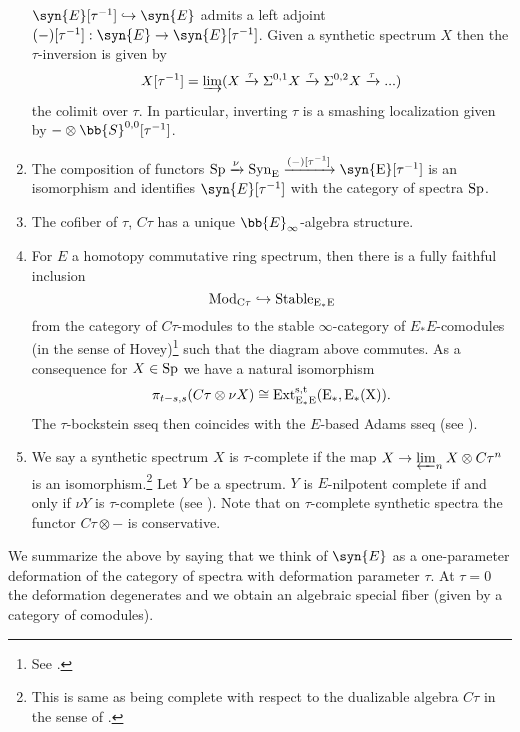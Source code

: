 \begin{rec}
\begin{enumerate}
        $\syn{E}[\tau^{-1}] \hookrightarrow \syn{E}$
        admits a left adjoint 
        $(-)[\tau^{-1}]: \syn{E} \rightarrow \syn{E}[\tau^{-1}]$. 
        Given a synthetic spectrum $X$ then the $\tau$-inversion is given by
        $$X[\tau^{-1}] = \varinjlim ( X \xrightarrow{\tau} \Sigma^{0,1} X \xrightarrow{\tau} \Sigma^{0,2}X \xrightarrow{\tau}...)$$
        the colimit over $\tau$. 
        In particular, inverting $\tau$ is a smashing localization given by $- \otimes \bb{S}^{0,0}[\tau^{-1}]$.
        \item The composition of functors $\rm{Sp} \xrightarrow{\nu} \rm{Syn}_E \xrightarrow{(-)[\tau^{-1}]} \syn{E}[\tau^{-1}]$ is an isomorphism and identifies $\syn{E}[\tau^{-1}]$ with the category of spectra $\rm{Sp}$.
        \item The cofiber of $\tau$, $C\tau$ has a unique $\bb{E}_\infty$-algebra structure.
        \item For $E$ a homotopy commutative ring spectrum, then there is a fully faithful inclusion 
        \[ \rm{Mod}_{C\tau} \hookrightarrow \rm{Stable}_{E_*E} \] 
        from the category of $C\tau$-modules to the stable $\infty$-category of $E_*E$-comodules (in the sense of Hovey)\footnote{See \cite[Section~3.2]{pstrągowski2022synthetic}.} 
        such that the diagram above commutes.
        As a consequence for $X \in \rm{Sp}$ we have a natural isomorphism
        $$\pi_{t-s,s}(C\tau \otimes \nu X) \cong \rm{Ext}^{s,t}_{{E}_{*} E}(E_*, E_{*}(X)).$$
        The $\tau$-bockstein sseq then coincides with the $E$-based Adams sseq (see \cite[Section~9]{burklund2022boundaries}).
        \item We say a synthetic spectrum $X$ is $\tau$-complete if the map 
        $X \rightarrow \varprojlim_{n} X \otimes C \tau^n$ is an isomorphism.\footnote{This is same as being complete with respect to the dualizable algebra $C\tau$ in the sense of \cite[Section~2]{MNN17}.} Let $Y$ be a spectrum. $Y$ is $E$-nilpotent complete if and only if $\nu Y$ is $\tau$-complete (see \cite[Prop~A.13]{burklund2022boundaries}).
        Note that on $\tau$-complete synthetic spectra the functor $C\tau \otimes -$ is conservative.\hfill\qedhere
    \end{enumerate}
\end{rec}

We summarize the above by saying that we think of $\syn{E}$ as a one-parameter deformation of the category of spectra with deformation parameter $\tau$. At $\tau = 0$ the deformation degenerates and we obtain an algebraic special fiber (given by a category of comodules).




